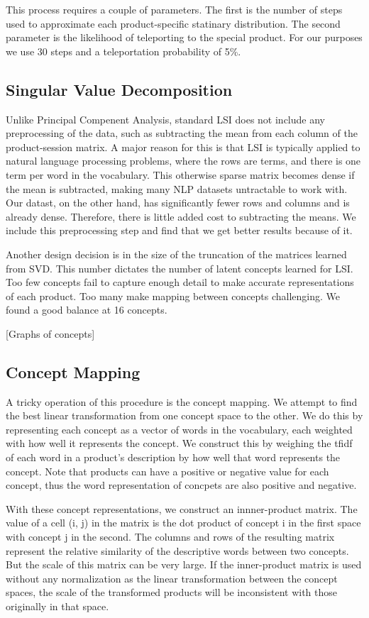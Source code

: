 \documentclass[11pt]{article}
\begin{document}
This process requires a couple of parameters. The first is the number of steps used to
approximate each product-specific statinary distribution. The second parameter
is the likelihood of teleporting to the special product. For our purposes we use
30 steps and a teleportation probability of 5\%.

\subsection*{Singular Value Decomposition}
Unlike Principal Compenent Analysis, standard LSI does not include any
preprocessing of the data, such as subtracting the mean from each column of the
product-session matrix. A major reason for this is that LSI is typically applied
to natural language processing problems, where the rows are terms, and there is
one term per word in the vocabulary. This otherwise sparse matrix becomes dense
if the mean is subtracted, making many NLP datasets untractable to work with. 
Our datast, on the other hand, has significantly fewer rows and columns and is
already dense. Therefore, there is little added cost to subtracting the
means. We include this preprocessing step and find that we get better results
because of it.

Another design decision is in the size of the truncation of the matrices learned
from SVD. This number dictates the number of latent concepts learned for LSI.
Too few concepts fail to capture enough detail to make accurate representations
of each product. Too many make mapping between concepts challenging. We found a
good balance at 16 concepts. 

[Graphs of concepts]

\subsection*{Concept Mapping}
A tricky operation of this procedure is the concept mapping. We attempt to find
the best linear transformation from one concept space to the other. We do this
by representing each concept as a vector of words in the vocabulary, each
weighted with how well it represents the concept. We construct this by weighing
the tfidf of each word in a product's description by how well that word
represents the concept. Note that products can have a positive or negative value
for each concept, thus the word representation of concpets are also positive and
negative. 

With these concept representations, we construct an innner-product matrix. The 
value of a cell (i, j) in the matrix is the dot product of concept i in the first 
space with concept j in the second. The columns and rows of the resulting matrix
represent the relative similarity of the descriptive words between two concepts.
But the scale of this matrix can be very large. If the inner-product matrix is
used without any normalization as the linear transformation between the concept
spaces, the scale of the transformed products will be inconsistent with those
originally in that space. 
\end{document}
